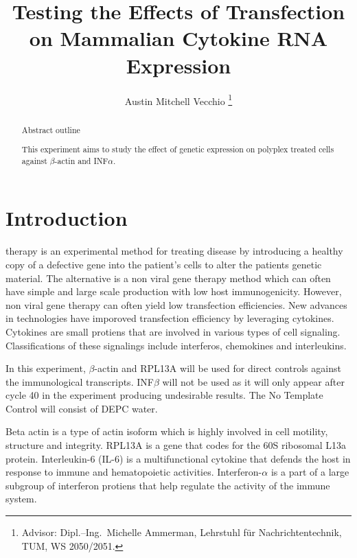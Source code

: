 \documentclass[journal, a4paper]{IEEEtran}
\begin{document}
\title{Testing the Effects of Transfection on Mammalian Cytokine RNA Expression}
\author{Austin Mitchell Vecchio
\thanks{Advisor: Dipl.--Ing.~Michelle Ammerman, Lehrstuhl f\"ur Nachrichtentechnik, TUM, WS 2050/2051.}}
\maketitle

\begin{abstract}
  Abstract outline

  This experiment aims to study the effect of genetic expression on polyplex treated cells against $\beta$-actin and INF$\alpha$.

\end{abstract}

\section{Introduction}
   therapy is an experimental method for treating disease by introducing a healthy copy of a
  defective gene into the patient's cells to alter the patients genetic material.
  The alternative is a non viral gene therapy method which can often have simple and large scale production
  with low host immunogenicity. However, non viral gene therapy can often yield low transfection efficiencies.
  New advances in technologies have imporoved transfection efficiency by leveraging cytokines. Cytokines
  are small protiens that are involved in various types of cell signaling. Classifications of these signalings
  include interferos, chemokines and interleukins.

  In this experiment, $\beta$-actin and RPL13A will be used for direct controls against the immunological transcripts.
  INF$\beta$ will not be used as it will only appear after cycle 40 in the experiment producing undesirable results.
  The No Template Control will consist of DEPC water.

  Beta actin is a type of actin isoform which is highly involved in cell motility, structure and integrity.
  RPL13A is a gene that codes for the 60S ribosomal L13a protein.
  Interleukin-6 (IL-6) is a multifunctional cytokine that defends the host in response to immune and hematopoietic activities.
  Interferon-$\alpha$ is a part of a large subgroup of interferon protiens that help regulate the activity of the immune system.
\end{document}
